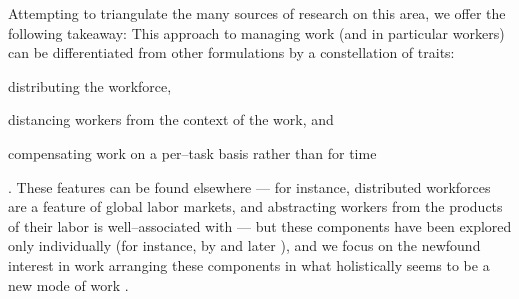 \documentclass[trackingWork]{subfiles}
\begin{document}
Attempting to triangulate the many sources of research on this area,
we offer the following takeaway:
This approach to managing work (and in particular workers)
can be differentiated from other formulations by a constellation of traits:
\begin{inlinelist}
\item distributing the workforce, %
\item distancing workers from the context of the work, and
\item compensating work on a per--task basis rather than for time
\end{inlinelist}.
These features can be found elsewhere
--- for instance,
distributed workforces
are a feature of global labor markets,
and abstracting workers from the products of their labor
is well--associated with
\citeauthor{marx2012economic} ---
but these components have been explored only individually
(for instance, by \citeauthor{fevre1986contract} and later \citeauthor{kalleberg2000nonstandard}),
and we focus on the newfound interest in
work arranging these components in what holistically seems to be a new mode of work
\cite{kalleberg2000nonstandard,fevre1986contract,marx2012economic}.



\end{document}
